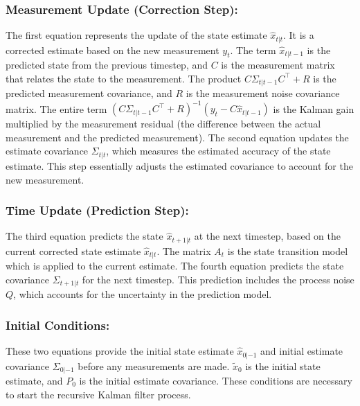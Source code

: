 \documentclass{article}
\begin{document}
  \subsubsection*{Measurement Update (Correction Step):}
  The first equation represents the update of the state estimate
  $\hat{x}_{t|t}$. It is a corrected estimate based on the new measurement
  $y_t$. The term $\hat{x}_{t|t-1}$ is the predicted state from the previous
  timestep, and $C$ is the measurement matrix that relates the state to the
  measurement. The product $C\Sigma_{t|t-1}C^\intercal + R$ is the predicted
  measurement covariance, and $R$ is the measurement noise covariance matrix.
  The entire term $(C\Sigma_{t|t-1}C^\intercal + R)^{-1}(y_t -
  C\hat{x}_{t|t-1})$ is the Kalman gain multiplied by the measurement residual
  (the difference between the actual measurement and the predicted measurement).
  The second equation updates the estimate covariance $\Sigma_{t|t}$, which
  measures the estimated accuracy of the state estimate. This step essentially
  adjusts the estimated covariance to account for the new measurement.

  \subsubsection*{Time Update (Prediction Step):}
  The third equation predicts the state $\hat{x}_{t+1|t}$ at the next timestep,
   based on the current corrected state estimate $\hat{x}_{t|t}$. The matrix
   $A_t$ is the state transition model which is applied to the current estimate.
   The fourth equation predicts the state covariance $\Sigma_{t+1|t}$ for the
   next timestep. This prediction includes the process noise $Q$, which accounts
   for the uncertainty in the prediction model.

  \subsubsection*{Initial Conditions:}
  These two equations provide the initial state estimate $\hat{x}_{0|-1}$ and
  initial estimate covariance $\Sigma_{0|-1}$ before any measurements are made.
  $\tilde{x}_0$ is the initial state estimate, and $P_0$ is the initial estimate
  covariance. These conditions are necessary to start the recursive Kalman
  filter process.
\end{document}
